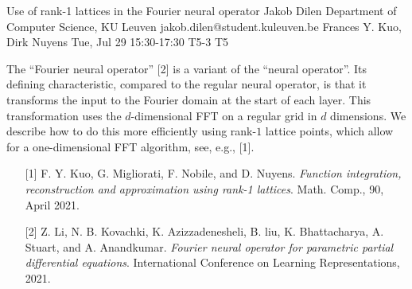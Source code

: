 \begin{talk}
\end{talk}

\begin{talk}
  {Use of rank-1 lattices in the Fourier neural operator}%
  {Jakob Dilen}%
  {Department of Computer Science, KU Leuven}%
  {jakob.dilen@student.kuleuven.be}%
  {Frances Y. Kuo, Dirk Nuyens}%
  {}%
  {Tue, Jul 29 15:30-17:30}%
  {T5-3}%
  {T5}%
  
				

The ``Fourier neural operator'' [2] is a variant of the ``neural operator''.
Its defining characteristic, compared to the regular neural operator, is that it transforms the input to the Fourier domain at the start of each layer. This transformation uses the $d$-dimensional FFT on a regular grid in $d$ dimensions. We describe how to do this more efficiently using rank-$1$ lattice points, which allow for a one-dimensional FFT algorithm, see, e.g., [1]. 

\medskip
\begin{enumerate}
        \item[{[1]}] F. Y. Kuo, G. Migliorati, F. Nobile, and D. Nuyens. \textit{Function integration,
reconstruction and approximation using rank-1 lattices}. Math. Comp., 90, April
2021.   
        \item[{[2]}] Z. Li, N. B. Kovachki, K. Azizzadenesheli, B. liu, K. Bhattacharya, A. Stuart,
and A. Anandkumar. \textit{Fourier neural operator for parametric partial differential
equations}. International Conference on Learning Representations, 2021.
\end{enumerate}
\end{talk}

